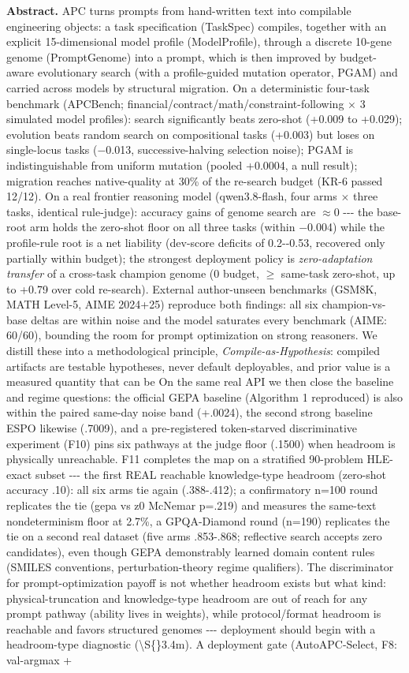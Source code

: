 \textbf{Abstract.} APC turns prompts from hand-written text into compilable engineering objects: a task specification (TaskSpec) compiles, together with an explicit 15-dimensional model profile (ModelProfile), through a discrete 10-gene genome (PromptGenome) into a prompt, which is then improved by budget-aware evolutionary search (with a profile-guided mutation operator, PGAM) and carried across models by structural migration. On a deterministic four-task benchmark (APCBench; financial/contract/math/constraint-following \(\times\) 3 simulated model profiles): search significantly beats zero-shot (+0.009 to +0.029); evolution beats random search on compositional tasks (+0.003) but loses on single-locus tasks (\(-\)0.013, successive-halving selection noise); PGAM is indistinguishable from uniform mutation (pooled +0.0004, a null result); migration reaches native-quality at 30\% of the re-search budget (KR-6 passed 12/12). On a real frontier reasoning model (qwen3.8-flash, four arms \(\times\) three tasks, identical rule-judge): accuracy gains of genome search are \(\approx\)0 -\/-\/- the base-root arm holds the zero-shot floor on all three tasks (within \(-\)0.004) while the profile-rule root is a net liability (dev-score deficits of 0.2-\/-0.53, recovered only partially within budget); the strongest deployment policy is \emph{zero-adaptation transfer} of a cross-task champion genome (0 budget, \(\geq\) same-task zero-shot, up to +0.79 over cold re-search). External author-unseen benchmarks (GSM8K, MATH Level-5, AIME 2024+25) reproduce both findings: all six champion-vs-base deltas are within noise and the model saturates every benchmark (AIME: 60/60), bounding the room for prompt optimization on strong reasoners. We distill these into a methodological principle, \emph{Compile-as-Hypothesis}: compiled artifacts are testable hypotheses, never default deployables, and prior value is a measured quantity that can be On the same real API we then close the baseline and regime questions: the official GEPA baseline (Algorithm 1 reproduced) is also within the paired same-day noise band (+.0024), the second strong baseline ESPO likewise (.7009), and a pre-registered token-starved discriminative experiment (F10) pins six pathways at the judge floor (.1500) when headroom is physically unreachable. F11 completes the map on a stratified 90-problem HLE-exact subset -\/-\/- the first REAL reachable knowledge-type headroom (zero-shot accuracy .10): all six arms tie again (.388-.412); a confirmatory n=100 round replicates the tie (gepa vs z0 McNemar p=.219) and measures the same-text nondeterminism floor at 2.7\%, a GPQA-Diamond round (n=190) replicates the tie on a second real dataset (five arms .853-.868; reflective search accepts zero candidates), even though GEPA demonstrably learned domain content rules (SMILES conventions, perturbation-theory regime qualifiers). The discriminator for prompt-optimization payoff is not whether headroom exists but what kind: physical-truncation and knowledge-type headroom are out of reach for any prompt pathway (ability lives in weights), while protocol/format headroom is reachable and favors structured genomes -\/-\/- deployment should begin with a headroom-type diagnostic (\textbackslash S\{\}3.4m). A deployment gate (AutoAPC-Select, F8: val-argmax + 